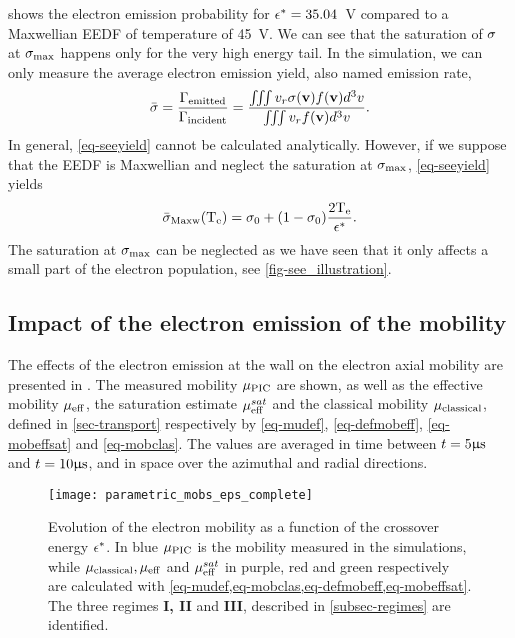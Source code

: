    shows the electron emission probability for $\epsilon^{*}=35.04$~V compared to a Maxwellian \ac{EEDF} of temperature of 45~V.
  We can see that the saturation of $\sigma $ at $\sigma _{\rm max} $ happens only for the very high energy tail.
  In the simulation, we can only measure the average electron emission yield, also named emission rate, 
  \begin{equation} \label{eq-seeyield}
     \bar{\sigma } = \frac{\Gamma_{\rm emitted}}{\Gamma_{\rm incident}} = \frac{\iiint v_r \sigma ({\mathbf v}) f({\mathbf v}) d^3v}{\iiint v_r  f({\mathbf v}) d^3v}.
  \end{equation}
  In general, \cref{eq-seeyield} cannot be calculated analytically.
  However, if we suppose that the \ac{EEDF} is Maxwellian and neglect the saturation at $\sigma _{\rm max} $, \cref{eq-seeyield} yields
  \begin{equation} \label{eq-seemaxw}
     \bar{\sigma }_{\rm Maxw}(\mathrm{T_e}) = \sigma _0 + (1 - \sigma _0) \frac{2 \mathrm{T_e}}{\epsilon^{*}}.
  \end{equation}
  The saturation at $\sigma _{\rm max} $ can be neglected as we have seen that it only affects a small part of the electron population, see \cref{fig-see_illustration}.
  
  \subsection{Impact of the electron emission of the mobility} \label{subsec-param-mob}
    
  The effects of the electron emission at the wall on the electron axial mobility are presented in .
  The measured mobility $\mu_{\mathrm{PIC}}$ are shown, as well as the effective mobility $\mu_{\mathrm{eff}}$, the saturation estimate $\mu_{\mathrm{eff}}^{sat}$ and the classical mobility $\mu_{\mathrm{classical}}$, defined in \cref{sec-transport} respectively by \cref{eq-mudef}, \cref{eq-defmobeff}, \cref{eq-mobeffsat} and \cref{eq-mobclas}.
  The values are averaged in time between $t=5 \mathrm{\upmu s}$ and $t=10\mathrm{\upmu s}$, and in space over the azimuthal and radial directions.
  \begin{figure}[hbtp]
    \centering
    \texttt{[image: parametric\_mobs\_eps\_complete]}
    \caption{Evolution of the electron mobility as a function of the crossover energy $\epsilon^{*}$. In blue $\mu_{\mathrm{PIC}}$ is the mobility measured in the simulations, while $\mu_{\mathrm{classical}}, \mu_{\mathrm{eff}}$ and $\mu_{\mathrm{eff}}^{sat}$ in purple, red and green respectively are calculated with \cref{eq-mudef,eq-mobclas,eq-defmobeff,eq-mobeffsat}. The three regimes {\bf I, II} and {\bf III}, described in \cref{subsec-regimes} are identified.}
    \label{fig-mob-epsstar}
  \end{figure}
  
